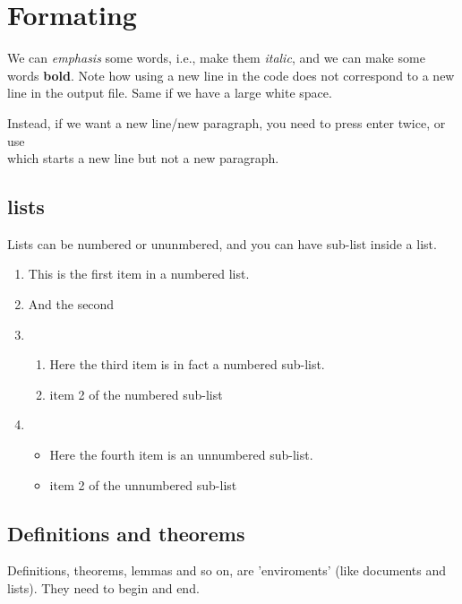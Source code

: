 \documentclass[a4paper,11pt]{article}
\theoremstyle{definition}
\begin{document}
\section{Formating}

We can \emph{emphasis} some words, i.e., make them \emph{italic}, and we can make some words \textbf{bold}.
Note how using a new line in the code does not correspond to a new line in the output file.
Same if we have        a           large                white                   space.

Instead, if we want a new line/new paragraph, you need to press enter twice, or use \\
which starts a new line but not a new paragraph.

\subsection{lists}

Lists can be numbered or ununmbered, and you can have sub-list inside a list.

\begin{enumerate}
	\item This is the first item in a numbered list.

	\item And the second
	
	\item 
	\begin{enumerate}
		\item Here the third item is in fact a numbered sub-list.
		\item item 2 of the numbered sub-list
	\end{enumerate}

	\item 
	\begin{itemize}
		\item Here the fourth item is an unnumbered sub-list.
		\item item 2 of the unnumbered sub-list
	\end{itemize}
\end{enumerate}

\subsection{Definitions and theorems}

Definitions, theorems, lemmas and so on, are 'enviroments' (like documents and lists). They need to begin and end.
\end{document}

